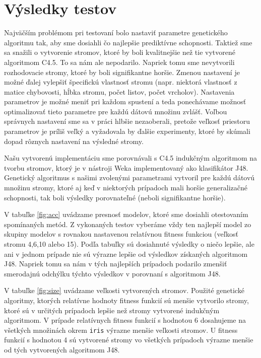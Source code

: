 \section{Výsledky testov}\label{kap5:Results}
Najväčším problémom pri testovaní bolo nastaviť parametre genetického algoritmu tak, aby sme dosiahli čo najlepšie prediktívne schopnosti. Taktiež sme sa snažili o vytvorenie stromov, ktoré by boli kvalitnejšie než tie vytvorené algoritmom C4.5. To sa nám ale nepodarilo. Napriek tomu sme nevytvorili rozhodovacie stromy, ktoré by boli signifikantne horšie. Zmenou nastavení je možné ďalej vylepšiť špecifickú vlastnosť stromu (napr. niektorá vlastnosť z matice chybovosti, hĺbka stromu, počet listov, počet vrcholov). Nastavenia parametrov je možné meniť pri každom spustení a teda ponechávame možnosť optimalizovať tieto parametre pre každú dátovú množinu zvlášť. Voľbou správnych nastavení sme sa v práci hlbšie nezaoberali, pretože veľkosť priestoru parametrov je príliš veľký a vyžadovala by ďalšie experimenty, ktoré by skúmali dopad rôznych nastavení na výsledné stromy.

Našu vytvorenú implementáciu sme porovnávali s C4.5 indukčným algoritmom na tvorbu stromov, ktorý je v nástroji Weka implementovaný ako klasifikátor J48. Genetický algoritmus s našimi zvolenými parametrami vytvoril pre každú dátovú množinu stromy, ktoré aj keď v niektorých prípadoch mali horšie generalizačné schopnosti, tak boli výsledky porovnateľné (neboli signifikantne horšie).

V tabuľke \ref{fig:acc} uvádzame presnosť modelov, ktoré sme dosiahli otestovaním spomínaných metód. Z vykonaných testov vyberáme vždy ten najlepší model zo skupiny modelov s rovnakou nastavenou relatívnou fitness funkciou (veľkosť stromu 4,6,10 alebo 15). Podľa tabuľky sú dosiahnuté výsledky o niečo lepšie, ale ani v jednom prípade nie sú výrazne lepšie od výsledkov získaných algoritmom J48. Napriek tomu sa nám v tých najlepších prípadoch podarilo zmenšiť smerodajnú odchýlku týchto výsledkov v porovnaní s algoritmom J48.

V tabuľke \ref{fig:size} uvádzame veľkosti vytvorených stromov. Použité genetické algoritmy, ktorých relatívne hodnoty fitness funkcií sú menšie vytvorilo stromy, ktoré sú v určitých prípadoch lepšie než stromy vytvorené indukčným algoritmom. V prípade relatívnych fitness funkcií s hodnotou 6 dosahujeme na všetkých množinách okrem \verb|iris| výrazne menšie veľkosti stromov. U fitness funkcií s hodnotou 4 sú vytvorené stromy vo všetkých prípadoch výrazne menšie od tých vytvorených algoritmom J48. 

